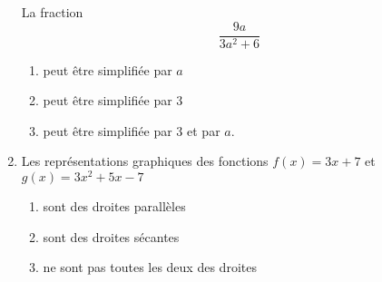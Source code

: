 \begin{exercice}[\ldots/4]
\begin{multicols}{2}
\begin{enumerate}
    La fraction
    \begin{equation*}
        \frac{ 9a }{ 3a^2+6 }
    \end{equation*}
    
    \begin{enumerate}
        \item
            peut être simplifiée par \( a\)
        \item
            peut être simplifiée par \( 3\)
        \item
            peut être simplifiée par \( 3\) et par \( a\).
    \end{enumerate}

\item

    Les représentations graphiques des fonctions \( f(x)=3x+7\) et \( g(x)=3x^2+5x-7\)
    \begin{enumerate}
        \item
            sont des droites parallèles
        \item
            sont des droites sécantes
        \item
            ne sont pas toutes les deux des droites
    \end{enumerate}

    \end{enumerate}
    \end{multicols}

\end{exercice}

